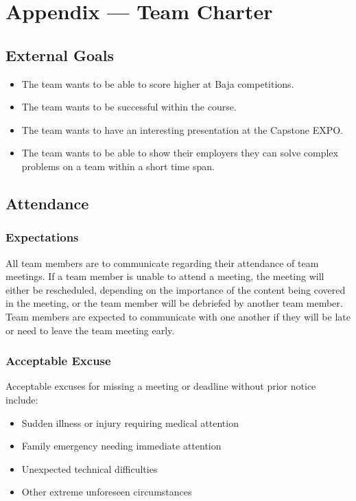 \documentclass{article}
\begin{document}
\newpage{}

\section*{Appendix --- Team Charter}

\subsection*{External Goals}

\begin{itemize}
  \item The team wants to be able to score higher at Baja competitions.
  \item The team wants to be successful within the course.
  \item The team wants to have an interesting presentation at the Capstone EXPO.
  \item The team wants to be able to show their employers they can solve complex problems on a team within a short time span.
\end{itemize}

\subsection*{Attendance}

\subsubsection*{Expectations}

All team members are to communicate regarding their attendance of team meetings.
If a team member is unable to attend a meeting, the meeting will either be rescheduled, depending on the importance of the content being covered in the meeting, or the team member will be debriefed by another team member. 
Team members are expected to communicate with one another if they will be late or need to leave the team meeting early. 

\subsubsection*{Acceptable Excuse}

\noindent Acceptable excuses for missing a meeting or deadline without prior notice include:
\begin{itemize}
  \item Sudden illness or injury requiring medical attention
  \item Family emergency needing immediate attention
  \item Unexpected technical difficulties
  \item Other extreme unforeseen circumstances
\end{itemize}
\end{document}
